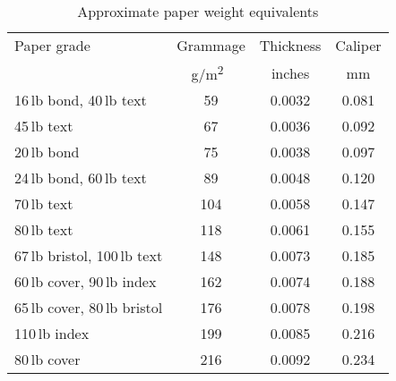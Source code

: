 \documentclass[10pt,a4paper,oneside,extrafontsizes]{memoir}%
\newcommand*{\sqrd}[1]{#1\textsuperscript{2}}
\newcommand*{\gsm}{g/\sqrd{m}}
\newcommand\U[2]{\textrm{#1}\,\textrm{#2}}
\begin{document}
\begin{table}
\centering
\caption{Approximate paper weight equivalents}\label{tab:weightequivs}
\begin{tabular}{lccc} \toprule
Paper grade & Grammage & Thickness &  Caliper \\ 
            & \gsm\    & inches    & mm       \\ \midrule
\U{16}{lb} bond, \U{40}{lb} text     & 59  & 0.0032 & 0.081 \\
\U{45}{lb} text                  & 67  & 0.0036 & 0.092 \\
\U{20}{lb} bond                  & 75  & 0.0038 & 0.097 \\
\U{24}{lb} bond, \U{60}{lb} text     & 89  & 0.0048 & 0.120 \\
\U{70}{lb} text                  & 104 & 0.0058 & 0.147  \\
\U{80}{lb} text                  & 118 & 0.0061 & 0.155 \\
\U{67}{lb} bristol, \U{100}{lb} text & 148 & 0.0073 & 0.185 \\
\U{60}{lb} cover, \U{90}{lb} index   & 162 & 0.0074 & 0.188 \\
\U{65}{lb} cover, \U{80}{lb} bristol & 176 & 0.0078 & 0.198 \\
\U{110}{lb} index                & 199 & 0.0085 & 0.216 \\
\U{80}{lb} cover                 & 216 & 0.0092 & 0.234 \\
\bottomrule
\end{tabular}
\end{table}
\end{document}
